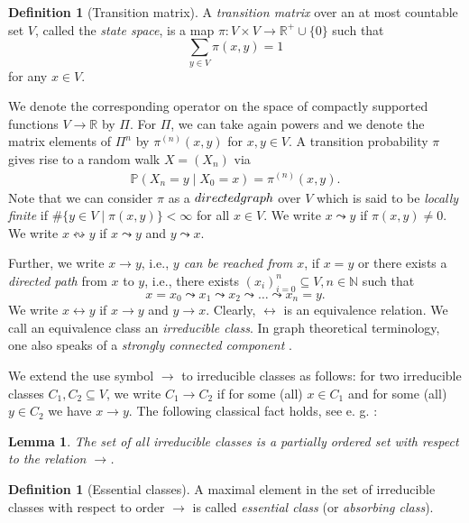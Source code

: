 \documentclass[a4paper,oneside, 12pt]{amsart}
\numberwithin{theorem}{section}
\newtheorem{lemma}[theorem]{Lemma}
\theoremstyle{definition}
\newtheorem{definition}[theorem]{Definition}
\newcommand{\prob}{\pi}
\newcommand{\Prob}{\Pi}
\begin{document}
{\begin{definition}[Transition matrix]
 A \emph{transition matrix} over an at most countable set $ V $, called the \emph{state space}, is  a map
$\prob:V\times V\rightarrow \mathbb R^+\cup\{0\}$ such that 
$$
\sum_{y\in V}\prob(x,y)= 1
$$ 
for any $x\in V$.
\end{definition}
We denote the corresponding operator on the space of compactly supported functions $ V\to \mathbb{R} $ by  $\Prob$.  For $ \Prob $, we can take again powers and we denote the matrix elements of $ \Prob^{n} $ by $ \prob^{(n)}(x,y) $ for $ x,y\in V $.  
A transition probability $ \prob $ gives rise to a  random walk $ X=(X_{n}) $ via
\begin{align*}
	\mathbb{P}( X_{n}=y \mid  {X}_{0}=x)=\prob^{(n)}(x,y).
\end{align*}
Note that we can  consider $ \pi $ as a $\emph{directed graph}$ over $ V $ which is said to be \emph{locally finite} if $\#\{y\in V\mid \pi(x,y) \} <\infty$ for all $ x\in V $. We write $x\leadsto y$ if $\prob(x,y)\ne 0$. We write $x\leftrightsquigarrow y$ if $x\leadsto y$  and $y\leadsto x$.

Further,  we write $x\to y$, i.e., \emph{$y$ can be reached from $x$}, if $ x=y $ or there exists a {\em directed path} from $x$ to $y$, i.e., there exists  $(x_i)_{i=0}^n\subseteq V, n\in \mathbb N$ such that
\begin{equation*}
x=x_0\leadsto x_1\leadsto x_2\leadsto \dots \leadsto x_n=y.
\end{equation*}
We write $x\leftrightarrow y$ if $x\to y$ and $y\to x$.
Clearly, 
$\leftrightarrow $ is an equivalence relation.
We call an equivalence class an {\em irreducible class}. In graph theoretical terminology, one also speaks of a \emph{strongly connected component} \cite[p.28]{Woess09}.

We extend the  use symbol $\to$ to irreducible classes as follows: for two irreducible classes $C_1, C_2\subseteq V$, we write $C_1\to C_2$ if for some (all) $x\in C_1$ and for some (all) $y\in C_2$ we have  $x\to y$. The following classical fact holds, see e. g. \cite[2.4 Lemma]{Woess09}:

\begin{lemma}
The set of all irreducible classes  is a partially ordered set with respect to the relation $\to$.
\end{lemma}



\begin{definition}[Essential classes]
A maximal element in the set of irreducible classes  with respect to order $\to$ is called \emph{essential class} (or \emph{absorbing class}). 
\end{definition}


}
\end{document}
